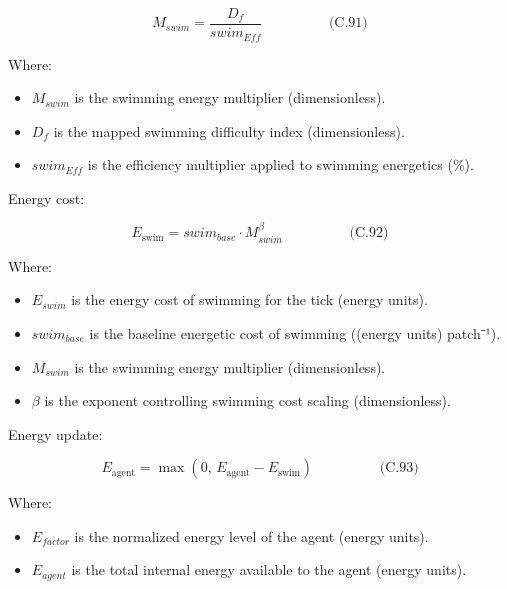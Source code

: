 \documentclass[
]{book}
\providecommand{\tightlist}{%
  \setlength{\itemsep}{0pt}\setlength{\parskip}{0pt}}
\begin{document}
\[
\begin{equation} M_{swim} = \frac{D_f}{swim_{Eff}}  \hspace{2cm} \text{(C.91)} \end{equation}
\]

Where:

\begin{itemize}
\tightlist
\item
  \(M_{swim}\) is the swimming energy multiplier (dimensionless).
\item
  \(D_f\) is the mapped swimming difficulty index (dimensionless).
\item
  \(swim_{Eff}\) is the efficiency multiplier applied to swimming
  energetics (\%).
\end{itemize}

Energy cost:

\[
\begin{equation} E_{\text{swim}}
=
swim_{base} \cdot M_{swim}^{\beta}  \hspace{2cm} \text{(C.92)} \end{equation}
\]

Where:

\begin{itemize}
\item
  \(E_{swim}\) is the energy cost of swimming for the tick (energy
  units).
\item
  \(swim_{base}\) is the baseline energetic cost of swimming ((energy
  units) patch⁻¹).
\item
  \(M_{swim}\) is the swimming energy multiplier (dimensionless).
\item
  \(\beta\) is the exponent controlling swimming cost scaling
  (dimensionless).
\end{itemize}

Energy update:

\[
\begin{equation} E_{\text{agent}}
=
\max \left(0,\, E_{\text{agent}} - E_{\text{swim}} \right)  \hspace{2cm} \text{(C.93)} \end{equation}
\]

Where:

\begin{itemize}
\tightlist
\item
  \(E_{factor}\) is the normalized energy level of the agent (energy
  units).
\item
  \(E_{agent}\) is the total internal energy available to the agent
  (energy units).
\end{itemize}
\end{document}
